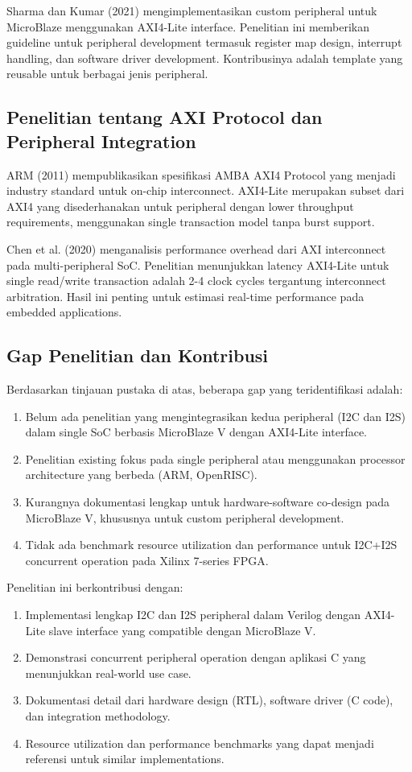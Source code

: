 Sharma dan Kumar (2021) mengimplementasikan custom peripheral untuk MicroBlaze menggunakan AXI4-Lite interface. Penelitian ini memberikan guideline untuk peripheral development termasuk register map design, interrupt handling, dan software driver development. Kontribusinya adalah template yang reusable untuk berbagai jenis peripheral.

\subsection{Penelitian tentang AXI Protocol dan Peripheral Integration}

ARM (2011) mempublikasikan spesifikasi AMBA AXI4 Protocol yang menjadi industry standard untuk on-chip interconnect. AXI4-Lite merupakan subset dari AXI4 yang disederhanakan untuk peripheral dengan lower throughput requirements, menggunakan single transaction model tanpa burst support.

Chen et al. (2020) menganalisis performance overhead dari AXI interconnect pada multi-peripheral SoC. Penelitian menunjukkan latency AXI4-Lite untuk single read/write transaction adalah 2-4 clock cycles tergantung interconnect arbitration. Hasil ini penting untuk estimasi real-time performance pada embedded applications.

\subsection{Gap Penelitian dan Kontribusi}

Berdasarkan tinjauan pustaka di atas, beberapa gap yang teridentifikasi adalah:

\begin{enumerate}
	\item Belum ada penelitian yang mengintegrasikan kedua peripheral (I2C dan I2S) dalam single SoC berbasis MicroBlaze V dengan AXI4-Lite interface.
	\item Penelitian existing fokus pada single peripheral atau menggunakan processor architecture yang berbeda (ARM, OpenRISC).
	\item Kurangnya dokumentasi lengkap untuk hardware-software co-design pada MicroBlaze V, khususnya untuk custom peripheral development.
	\item Tidak ada benchmark resource utilization dan performance untuk I2C+I2S concurrent operation pada Xilinx 7-series FPGA.
\end{enumerate}

Penelitian ini berkontribusi dengan:
\begin{enumerate}
	\item Implementasi lengkap I2C dan I2S peripheral dalam Verilog dengan AXI4-Lite slave interface yang compatible dengan MicroBlaze V.
	\item Demonstrasi concurrent peripheral operation dengan aplikasi C yang menunjukkan real-world use case.
	\item Dokumentasi detail dari hardware design (RTL), software driver (C code), dan integration methodology.
	\item Resource utilization dan performance benchmarks yang dapat menjadi referensi untuk similar implementations.
\end{enumerate}

